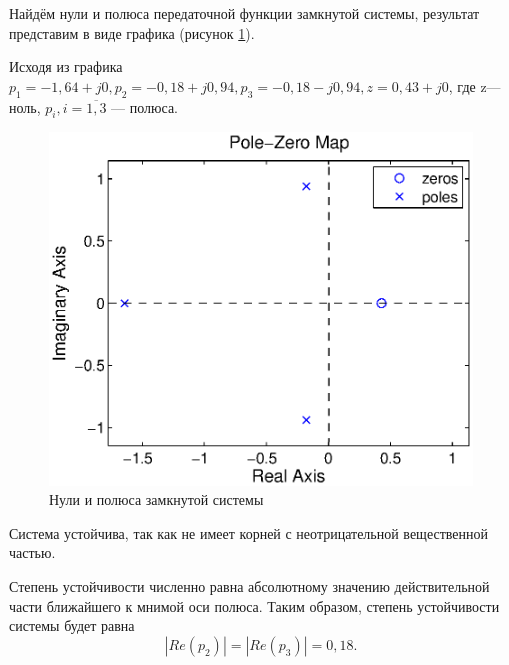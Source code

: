 \documentclass[12pt,a4paper]{article}
\begin{document}
Найдём нули и полюса передаточной функции замкнутой системы, результат представим в виде графика (рисунок \ref{pzmap2}).\par
Исходя из графика $p_1=-1,64+j0, p_2=-0,18+j0,94, p_3=-0,18-j0,94, z=0,43+j0$, где z---ноль, $p_i, i = \overline{1,3}$ --- полюса.
\begin{figure}[ht!]
	\centering
	\includegraphics[width=0.8\linewidth]{pzmap2}
	\caption{Нули и полюса замкнутой системы}
	\label{pzmap2}
\end{figure}\par

Система устойчива, так как не имеет корней с неотрицательной вещественной частью.
	
Степень устойчивости численно равна абсолютному значению действительной части ближайшего к мнимой оси полюса. Таким образом, степень устойчивости системы будет равна
\begin{equation}
    |Re (p_2)| = |Re(p_3)| = 0,18.
\end{equation}
\end{document}

